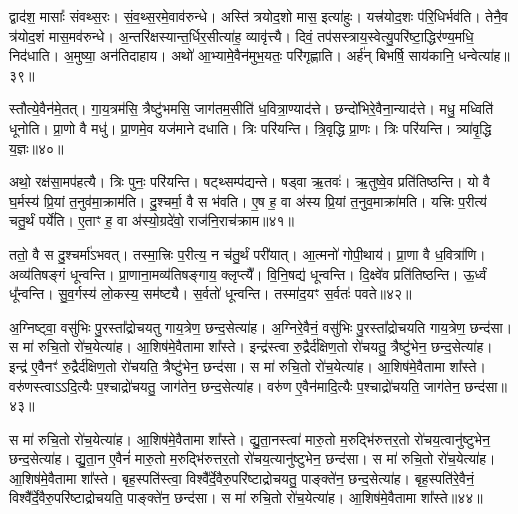 द्वाद॑श॒ मासाः᳚ संवथ्स॒रः। 
सं॒व॒थ्स॒रमे॒वाव॑रुन्धे। 
अस्ति॑ त्रयोद॒शो मास॒ इत्या॑हुः। 
यत्त्र॑योद॒शः प॑रि॒धिर्भव॑ति। 
तेनै॒व त्र॑योद॒शं मास॒मव॑रुन्धे। 
अ॒न्तरि॑क्षस्यान्त॒र्धिर॒सीत्या॑ह॒ व्यावृ॑त्त्यै। 
दिवं॒ तप॑सस्त्राय॒स्वेत्यु॒परि॑ष्टा॒द्धिर॑ण्य॒मधि॒ निद॑धाति। 
अ॒मुष्या॒ अन॑तिदाहाय। 
अथो॑ आ॒भ्यामे॒वैन॑मुभ॒यतः॒ परि॑गृह्णाति। 
अर्\mbox{}ह॑न् बिभर्\mbox{}षि॒ साय॑कानि॒ धन्वेत्या॑ह॥३९॥

स्तौत्ये॒वैन॑मे॒तत्। 
गा॒य॒त्रम॑सि॒ त्रैष्टु॑भमसि॒ जाग॑तम॒सीति॑ ध॒वित्रा॒ण्याद॑त्ते। 
छन्दो॑भिरे॒वैना॒न्याद॑त्ते। 
मधु॒ मध्विति॑ धूनोति। 
प्रा॒णो वै मधु॑। 
प्रा॒णमे॒व यज॑माने दधाति। 
त्रिः परि॑यन्ति। 
त्रि॒वृद्धि प्रा॒णः। 
त्रिः परि॑यन्ति। 
त्र्या॑वृ॒द्धि य॒ज्ञः॥४०॥

अथो॒ रक्ष॑सा॒मप॑हत्यै। 
त्रिः पुनः॒ परि॑यन्ति। 
षट्थ्सम्प॑द्यन्ते। 
षड्वा ऋ॒तवः॑। 
ऋ॒तुष्वे॒व प्रति॑तिष्ठन्ति। 
यो वै घ॒र्मस्य॑ प्रि॒यां त॒नुव॑मा॒क्राम॑ति। 
दु॒श्चर्मा॒ वै स भ॑वति। 
ए॒ष ह॒ वा अ॑स्य प्रि॒यां त॒नुव॒माक्रा॑मति। 
यत्त्रिः प॒रीत्य॑ चतु॒र्थं पर्ये॑ति। 
ए॒ताꣳ ह॒ वा अ॑स्यो॒ग्रदे॑वो॒ राज॑नि॒राच॑क्राम॥४१॥

ततो॒ वै स दु॒श्चर्मा॑ऽभवत्। 
तस्मा॒त्त्रिः प॒रीत्य॒ न च॑तु॒र्थं परी॑यात्। 
आ॒त्मनो॑ गोपी॒थाय॑। 
प्रा॒णा वै ध॒वित्रा॑णि। 
अव्य॑तिषङ्गं धून्वन्ति। 
प्रा॒णाना॒मव्य॑तिषङ्गाय॒ क्लृप्त्यै᳚। 
वि॒नि॒षद्य॑ धून्वन्ति। 
दि॒क्ष्वे॑व प्रति॑तिष्ठन्ति। 
ऊ॒र्ध्वं धू᳚न्वन्ति। 
सु॒व॒र्गस्य॑ लो॒कस्य॒ सम॑ष्ट्यै। 
स॒र्वतो॑ धून्वन्ति। 
तस्मा॑द॒यꣳ स॒र्वतः॑ पवते॥४२॥
\anuvakamend[द॒धा॒ती॒वान्वा॑ह य॒ज्ञस्या॑है॒ष उ॒परि॑ष्टादाशीर॒न्यो व्या᳚स्था॒पय॑न्ति र॒श्मयो॑ भवन्ति॒ धन्वेत्या॑ह य॒ज्ञश्च॑क्राम॒ सम॑ष्ट्यै॒ द्वे च॑]

अ॒ग्निष्ट्वा॒ वसु॑भिः पु॒रस्ता᳚द्रोचयतु गाय॒त्रेण॒ छन्द॒सेत्या॑ह। 
अ॒ग्निरे॒वैनं॒ वसु॑भिः पु॒रस्ता᳚द्रोचयति गाय॒त्रेण॒ छन्द॑सा। 
स मा॑ रुचि॒तो रो॑च॒येत्या॑ह। 
आ॒शिष॑मे॒वैतामा शा᳚स्ते। 
इन्द्र॑स्त्वा रु॒द्रैर्द॑क्षिण॒तो रो॑चयतु॒ त्रैष्टु॑भेन॒ छन्द॒सेत्या॑ह। 
इन्द्र॑ ए॒वैनꣳ॑ रु॒द्रैर्द॑क्षिण॒तो रो॑चयति॒ त्रैष्टु॑भेन॒ छन्द॑सा। 
स मा॑ रुचि॒तो रो॑च॒येत्या॑ह। 
आ॒शिष॑मे॒वैतामा शा᳚स्ते। 
वरु॑णस्त्वाऽऽदि॒त्यैः प॒श्चाद्रो॑चयतु॒ जाग॑तेन॒ छन्द॒सेत्या॑ह। 
वरु॑ण ए॒वैन॑मादि॒त्यैः प॒श्चाद्रो॑चयति॒ जाग॑तेन॒ छन्द॑सा॥४३॥

स मा॑ रुचि॒तो रो॑च॒येत्या॑ह। 
आ॒शिष॑मे॒वैतामा शा᳚स्ते। 
द्यु॒ता॒नस्त्वा॑ मारु॒तो म॒रुद्भि॑रुत्तर॒तो रो॑चय॒त्वानु॑ष्टुभेन॒ छन्द॒सेत्या॑ह। 
द्यु॒ता॒न ए॒वैनं॑ मारु॒तो म॒रुद्भि॑रुत्तर॒तो रो॑चय॒त्यानु॑ष्टुभेन॒ छन्द॑सा। 
स मा॑ रुचि॒तो रो॑च॒येत्या॑ह। 
आ॒शिष॑\-मे॒वैतामा शा᳚स्ते। 
बृह॒स्पति॑स्त्वा॒ विश्वै᳚र्दे॒वैरु॒परि॑ष्टा\-द्रोचयतु॒ पाङ्क्ते॑न॒ छन्द॒सेत्या॑ह। 
बृह॒स्पति॑रे॒वैनं॒  विश्वै᳚र्दे॒वै\-रु॒परि॑ष्टाद्रोचयति॒ पाङ्क्ते॑न॒ छन्द॑सा। 
स मा॑ रुचि॒तो रो॑च॒येत्या॑ह। 
आ॒शिष॑मे॒वैतामा शा᳚स्ते॥४४॥

